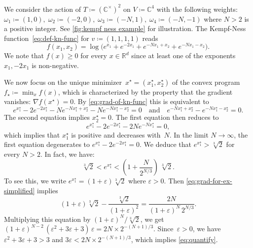 \documentclass[a4paper,USenglish,cleveref,numberwithinsect]{lipics-v2021}
\newcommand{\CC}{\mathbb{C}}
\newcommand{\RR}{\mathbb{R}}
\numberwithin{equation}{section}
\begin{document}
\begin{example}
\label{ex:small-hessian}
We consider the action of $T\coloneqq (\CC^\times)^2$ on $V\coloneqq\CC^4$ with the following weights: $\omega_1\coloneqq (1,0),\;\omega_2\coloneqq (-2,0),\; \omega_3\coloneqq(-N,1),\; \omega_4\coloneqq(-N,-1)$ where $N>2$ is a positive integer.
See \cref{fig:kempf ness example} for illustration.
The Kempf-Ness function~\eqref{eq:def-kn-func} for $v\coloneqq (1,1,1,1)$ reads
\[
f(x_1,x_2) = \log\Big( e^{x_1} + e^{-2x_1} + e^{-N x_1 + x_2} + e^{-N x_1 - x_2}\Big).
\]
We note that $f(x)\geq 0$ for every $x\in\RR^d$ since at least one of the exponents $x_1, -2x_1$ is non-negative.

We now focus on the unique minimizer~$x^\star=(x^\star_1,x^\star_2)$ of the convex program $f_\star\coloneqq\min_x f(x)$, which is characterized by the property that the gradient vanishes: $\nabla f(x^\star)=0$.
By \cref{eq:grad-of-kn-func} this is equivalent to
\begin{equation}\label{eq:grad-for-ex}
	e^{x^\star_1} - 2e^{-2x^\star_1} - N e^{-Nx^\star_1+x^\star_2}  - N e^{-Nx^\star_1-x^\star_2} = 0
\quad\text{and}\quad
  e^{-Nx^\star_1+x^\star_2} - e^{-Nx^\star_1-x^\star_2} = 0.
\end{equation}
The second equation implies $x^\star_2=0$.
The first equation then reduces to
\begin{equation}\label{eq:grad-for-ex-simplified}
  e^{x^\star_1} - 2e^{-2x^\star_1} - 2 N e^{-Nx^\star_1} = 0,
\end{equation}
which implies that $x^\star_1$ is positive and decreases with~$N$.
In the limit $N\rightarrow\infty$, the first equation degenerates to $e^{x^\star_1}-2 e^{-2x^\star_1}=0$.
We deduce that $e^{x^{\star}_1}>\sqrt[3]{2}$ for every $N>2$.
In fact, we have:
\begin{equation}\label{eq:quantify}
  \sqrt[3]{2} < e^{x^{\star}_1} < \left( 1+\frac N{2^{N/3}} \right)\, \sqrt[3]{2}.
\end{equation}
To see this, we write $e^{x^\star_1}=(1+\varepsilon)\sqrt[3]{2}$ where $\varepsilon>0$.
Then \cref{eq:grad-for-ex-simplified} implies
\[
  (1+\varepsilon) \sqrt[3]{2} - \frac{\sqrt[3]{2}}{(1+\varepsilon)^2} = \frac{2N}{(1+\varepsilon)^N\, 2^{N/3}}.
\]
Multiplying this equation by $(1+\varepsilon)^N / \sqrt[3]{2}$, we get $(1+\varepsilon)^{N-2}\,(\varepsilon^2 + 3\varepsilon+3)\, \varepsilon = 2N \times 2^{-(N+1)/3}$.
Since~$\varepsilon>0$, we have $\varepsilon^2+3\varepsilon+3>3$ and $3\varepsilon < 2N \times 2^{-(N+1)/3}$, which implies \cref{eq:quantify}.


\end{example}
\end{document}
